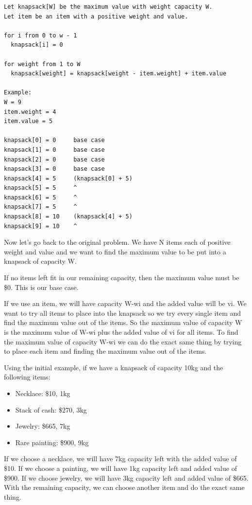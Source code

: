 \documentclass[11pt,oneside]{book}
\begin{document}
\begin{lstlisting}
Let knapsack[W] be the maximum value with weight capacity W.
Let item be an item with a positive weight and value.

for i from 0 to w - 1
  knapsack[i] = 0

for weight from 1 to W
  knapsack[weight] = knapsack[weight - item.weight] + item.value

Example:
W = 9
item.weight = 4
item.value = 5

knapsack[0] = 0     base case
knapsack[1] = 0     base case
knapsack[2] = 0     base case
knapsack[3] = 0     base case
knapsack[4] = 5     (knapsack[0] + 5)
knapsack[5] = 5     ^
knapsack[6] = 5     ^
knapsack[7] = 5     ^
knapsack[8] = 10    (knapsack[4] + 5)
knapsack[9] = 10    ^
\end{lstlisting}

Now let's go back to the original problem. We have N items each of positive weight and value and we want to find the maximum value to be put into a knapsack of capacity W.

If no items left fit in our remaining capacity, then the maximum value must be \$0. This is our base case.

If we use an item, we will have capacity W-wi and the added value will be vi. We want to try all items to place into the knapsack so we try every single item and find the maximum value out of the items. So the maximum value of capacity W is the maximum value of W-wi plus the added value of vi for all items. To find the maximum value of capacity W-wi we can do the exact same thing by trying to place each item and finding the maximum value out of the items.

Using the initial example, if we have a knapsack of capacity 10kg and the following items:

\begin{itemize}
\item Necklace: \$10, 1kg
\item Stack of cash: \$270, 3kg
\item Jewelry: \$665, 7kg
\item Rare painting: \$900, 9kg
\end{itemize}

If we choose a necklace, we will have 7kg capacity left with the added value of \$10. If we choose a painting, we will have 1kg capacity left and added value of \$900. If we choose jewelry, we will have 3kg capacity left and added value of \$665. With the remaining capacity, we can choose another item and do the exact same thing.
\end{document}
